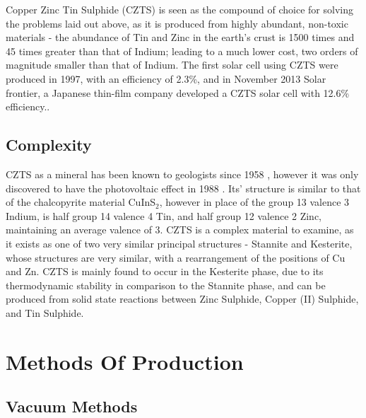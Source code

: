 \documentclass[11pt,a4paper,twoside]{article}
\begin{document}
Copper Zinc Tin Sulphide (CZTS) is seen as the compound of choice for solving the problems laid out above, as it is produced from highly abundant, non-toxic materials - the abundance of Tin and Zinc in the earth's crust is 1500 times and 45 times greater than that of Indium; leading to a much lower cost, two orders of magnitude smaller than that of Indium.\citep{Wadia2009,Wang2011} 
The first solar cell using CZTS were produced in 1997, with an efficiency of 2.3\%, and in November 2013 Solar frontier, a Japanese thin-film company developed a CZTS solar cell with 12.6\% efficiency.\citep{Wang2013}.


\subsection{Complexity}

CZTS as a mineral has been known to geologists since 1958 \citep{Kissin1989}, however it was only discovered to have the photovoltaic effect in 1988 \citep{Ito1988}. Its' structure is similar to that of the chalcopyrite material CuInS$_2$, however in place of the group 13 valence 3 Indium, is half group 14 valence 4 Tin, and half group 12 valence 2 Zinc, maintaining an average valence of 3. CZTS is a complex material to examine, as it exists as one of two very similar principal structures - Stannite and Kesterite, whose structures are very similar, with a rearrangement of the positions of Cu and Zn.\citep{Schorr2007} CZTS is mainly found to occur in the Kesterite phase, due to its thermodynamic stability in comparison to the Stannite phase, and can be produced from solid state reactions between Zinc Sulphide, Copper (II) Sulphide, and Tin Sulphide.


\section{Methods Of Production}

\subsection{Vacuum Methods}
\end{document}
